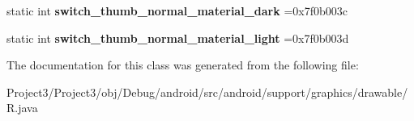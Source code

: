 \begin{DoxyCompactItemize}
\mbox{\label{classandroid_1_1support_1_1graphics_1_1drawable_1_1R_1_1color_a810aeece8cc32a20119211fc92bcffe6}} 
static int {\bfseries switch\+\_\+thumb\+\_\+normal\+\_\+material\+\_\+dark} =0x7f0b003c
\item 
\mbox{\label{classandroid_1_1support_1_1graphics_1_1drawable_1_1R_1_1color_a09c3d28bca99074b01d4e1e851d332d6}} 
static int {\bfseries switch\+\_\+thumb\+\_\+normal\+\_\+material\+\_\+light} =0x7f0b003d
\end{DoxyCompactItemize}


The documentation for this class was generated from the following file\+:\begin{DoxyCompactItemize}
\item 
Project3/\+Project3/obj/\+Debug/android/src/android/support/graphics/drawable/R.\+java\end{DoxyCompactItemize}
